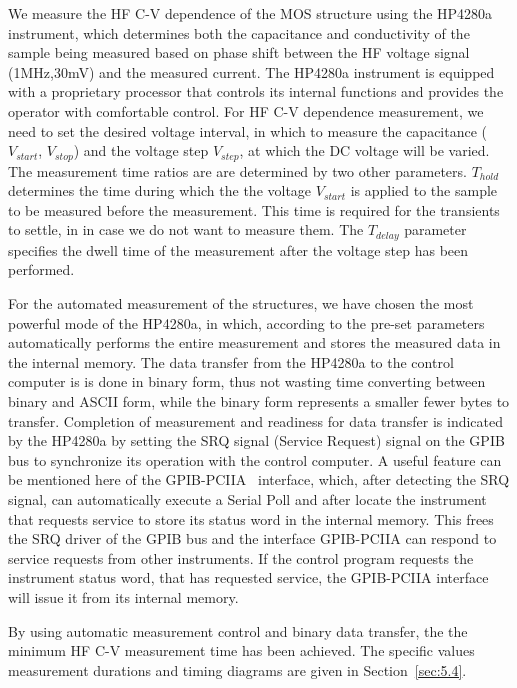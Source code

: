 We measure the HF C-V dependence of the MOS structure using the
HP4280a instrument, which determines both the capacitance and
conductivity of the sample being measured based on phase shift between
the HF voltage signal (1MHz,30mV) and the measured current. The
HP4280a instrument is equipped with a proprietary processor that
controls its internal functions and provides the operator with
comfortable control. For HF C-V dependence measurement, we need to set
the desired voltage interval, in which to measure the capacitance
($V_{start}$, $V_{stop}$) and the voltage step $V_{step}$, at which
the DC voltage will be varied. The measurement time ratios are are
determined by two other parameters. $T_{hold}$ determines the time
during which the the voltage $V_{start}$ is applied to the sample to
be measured before the measurement. This time is required for the
transients to settle, in in case we do not want to measure them. The
$T_{delay}$ parameter specifies the dwell time of the measurement
after the voltage step has been performed.

For the automated measurement of the structures, we have chosen the
most powerful mode of the HP4280a, in which, according to the pre-set
parameters automatically performs the entire measurement and stores
the measured data in the internal memory.  The data transfer from the
HP4280a to the control computer is is done in binary form, thus not
wasting time converting between binary and ASCII form, while the
binary form represents a smaller fewer bytes to transfer. Completion
of measurement and readiness for data transfer is indicated by the
HP4280a by setting the SRQ signal (Service Request) signal on the
GPIB bus to synchronize its operation with the control computer.  A
useful feature can be mentioned here of the GPIB-PCIIA~\cite{5.2}
interface, which, after detecting the SRQ signal, can automatically
execute a Serial Poll and after locate the instrument that requests
service to store its status word in the internal memory. This frees
the SRQ driver of the GPIB bus and the interface GPIB-PCIIA can
respond to service requests from other instruments. If the control
program requests the instrument status word, that has requested
service, the GPIB-PCIIA interface will issue it from its internal
memory.

By using automatic measurement control and binary data transfer, the
the minimum HF C-V measurement time has been achieved.  The specific
values measurement durations and timing diagrams are given in
Section~\ref{sec:5.4}.

